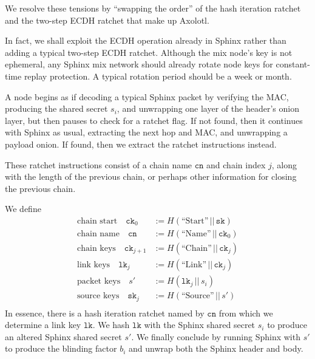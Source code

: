 \documentclass[twoside,letterpaper]{sig-alternate}
\def\mathcomma{,}
\def\mathperiod{.}
\def\mathcomma{}
\def\mathperiod{}
\begin{document}
We resolve these tensions by ``swapping the order'' of the hash iteration
ratchet and the two-step ECDH ratchet that make up Axolotl.  

In fact, we shall exploit the ECDH operation already in Sphinx rather
 than adding a typical two-step ECDH ratchet.
Although the mix node's key is not ephemeral, any Sphinx mix network
should already rotate node keys for constant-time replay protection.
A typical rotation period should be a week or month.

\smallskip


\def\cn{\texttt{cn}}
\def\ck{\texttt{ck}}
\def\DH{\texttt{DH}}
\def\lk{\texttt{lk}}
\def\mk{\texttt{mk}}
\def\sk{\texttt{sk}}
\def\ECDH{\textrm{ECDH}}

A node begins as if decoding a typical Sphinx packet by
 verifying the MAC,
 producing the shared secret $s_i$, and 
 unwrapping one layer of the header's onion layer,
but then pauses to check for a ratchet flag. 
If not found, then it continues with Sphinx as usual, 
 extracting the next hop and MAC, and unwrapping a payload onion.
If found, then we extract the ratchet instructions instead.

These ratchet instructions consist of
 a chain name $\cn$ and chain index $j$,
along with the length of the previous chain, or
 perhaps other information for closing the previous chain.  

We define
\[ \begin{aligned}
\textrm{chain start}\quad
 \ck_0 &:= H(\textrm{``Start''} \,||\, \sk) \mathcomma \\
\textrm{chain name}\quad
 \cn &:= H(\textrm{``Name''} \,||\, \ck_0) \mathcomma \\
\textrm{chain keys}\quad
 \ck_{j+1} &:= H(\textrm{``Chain''} \,||\, \ck_j) \mathcomma \\
\textrm{link keys}\quad
 \lk_j &:= H(\textrm{``Link''} \,||\, \ck_j) \mathcomma \\
\textrm{packet keys}\quad 
 s' &:= H(\lk_j \,||\, s_i) \mathcomma \\ %
\textrm{source keys}\quad 
 \sk_j &:= H(\textrm{``Source''} \,||\, s') \mathperiod \\
\end{aligned} \]
In essence, there is a hash iteration ratchet named by $\cn$
from which we determine a link key $\lk$.
We hash $\lk$ with the Sphinx shared secret $s_i$ to produce
an altered Sphinx shared secret $s'$.
We finally conclude by running Sphinx with $s'$ to produce the 
blinding factor $b_i$ and unwrap both the Sphinx header and body. 
\end{document}
